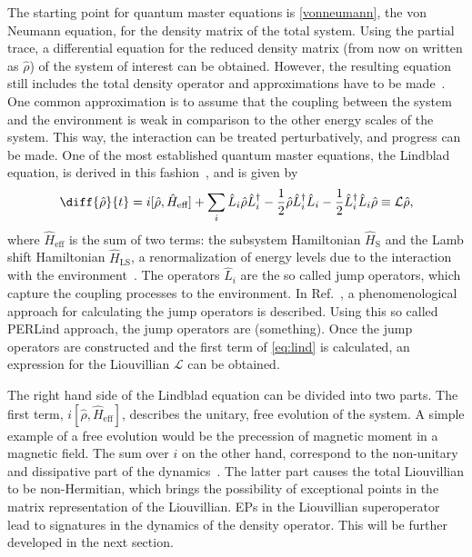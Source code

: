 \documentclass[../main.tex]{subfiles}
\begin{document}
The starting point for quantum master equations is \cref{vonneumann}, the von Neumann equation, for the density matrix of the total system. Using the partial trace, a differential equation for the reduced density matrix (from now on written as $\hat\rho$) of the system of interest can be obtained. However, the resulting equation still includes the total density operator and approximations have to be made~\cite{lindblad}. One common approximation is to assume that the coupling between the system and the environment is weak in comparison to the other energy scales of the system. This way, the interaction can be treated perturbatively, and progress can be made. One of the most established quantum master equations, the Lindblad equation, is derived in this fashion~\cite{lindorigin}, and is given by
\begin{equation}\label{eq:lind}
    \diff{\hat\rho}{t} = i[\hat\rho, \hat H_\text{eff}] + \sum_i \hat L_i\hat\rho\hat L_i^\dag - \frac{1}{2}\hat\rho\hat L_i^\dag\hat L_i - \frac{1}{2}\hat L_i^\dag\hat L_i \hat\rho \equiv \mathcal{L}\hat\rho,
\end{equation}
where $\hat H_\text{eff}$ is the sum of two terms: the subsystem Hamiltonian $\hat H_\text{S}$ and the Lamb shift Hamiltonian $\hat H_\text{LS}$, a renormalization of energy levels due to the interaction with the environment~\cite{lindblad}. The operators $\hat L_i$ are the so called jump operators, which capture the coupling processes to the environment. In Ref.~\cite{perlind}, a phenomenological approach for calculating the jump operators is described. Using this so called PERLind approach, the jump operators are (something). Once the jump operators are constructed and the first term of \cref{eq:lind} is calculated, an expression for the Liouvillian $\mathcal{L}$ can be obtained. 

The right hand side of the Lindblad equation can be divided into two parts. The first term, $i[\hat\rho, \hat H_\text{eff}]$, describes the unitary, free evolution of the system. A simple example of a free evolution would be the precession of magnetic moment in a magnetic field. The sum over $i$ on the other hand, correspond to the non-unitary and dissipative part of the dynamics~\cite{bookopen}. The latter part causes the total Liouvillian to be non-Hermitian, which brings the possibility of exceptional points in the matrix representation of the Liouvillian. EPs in the Liouvillian superoperator lead to signatures in the dynamics of the density operator. This will be further developed in the next section.  
\end{document}

